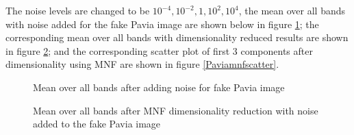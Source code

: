 \documentclass[conference,onecolumn]{IEEEtran}
\begin{document}
The noise levels are changed to be $10^{-4}, 10^{-2}, 1, 10^{2}, 10^{4}$, the  mean over all bands with noise added for the fake Pavia image are shown below in figure \ref{Paviamean}; the corresponding mean over all bands with dimensionality reduced results are shown in figure \ref{Paviamnfmean}; and the corresponding scatter plot of first 3 components after dimensionality using MNF are shown in figure \ref{Paviamnfscatter}.
\begin{figure}[H]
	\centering
	\caption{Mean over all bands after adding noise for fake Pavia image}
	\label{Paviamean}
\end{figure}

\begin{figure}[H]
	\centering
	\caption{Mean over all bands after MNF dimensionality reduction with noise added  to the fake Pavia image}
	\label{Paviamnfmean}
\end{figure}
\end{document}
